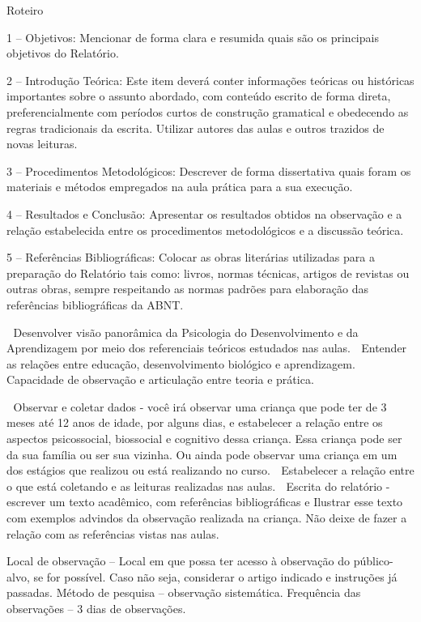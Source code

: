 \iffalse
Roteiro

1 – Objetivos: Mencionar de forma clara e resumida quais são os principais objetivos do Relatório.

2 – Introdução Teórica: Este item deverá conter informações teóricas ou históricas importantes sobre o assunto abordado, com conteúdo escrito de forma direta, preferencialmente com períodos curtos de construção gramatical e obedecendo as regras tradicionais da escrita. Utilizar autores das aulas e outros trazidos de novas leituras.

3 – Procedimentos Metodológicos: Descrever de forma dissertativa quais foram os materiais e métodos empregados na aula prática para a sua execução.

4 – Resultados e Conclusão: Apresentar os resultados obtidos na observação e a relação estabelecida entre os procedimentos metodológicos e a discussão teórica.

5 – Referências Bibliográficas: Colocar as obras literárias utilizadas para a preparação do Relatório tais como: livros, normas técnicas, artigos de revistas ou outras obras, sempre respeitando as normas padrões para elaboração das referências bibliográficas da ABNT.






	Desenvolver visão panorâmica da Psicologia do Desenvolvimento e da Aprendizagem por meio dos referenciais teóricos estudados nas aulas.
	Entender as relações entre educação, desenvolvimento biológico e aprendizagem.
	Capacidade de observação e articulação entre teoria e prática.

	Observar e coletar dados  - você irá observar uma criança que pode ter de 3 meses até 12 anos de idade, por alguns dias,  e estabelecer a relação entre os aspectos psicossocial, biossocial e cognitivo dessa criança. Essa criança pode ser da sua família ou ser sua vizinha. Ou ainda pode observar uma criança em um dos estágios que realizou ou está realizando no curso.
	Estabelecer a relação entre o que está coletando e as leituras realizadas nas aulas.
	Escrita do relatório -  escrever um texto acadêmico, com referências bibliográficas e Ilustrar esse texto com exemplos advindos da observação realizada na criança. Não deixe de fazer a relação com as referências vistas nas aulas.

Local de observação – Local em que possa ter acesso à observação do público-alvo, se for possível. Caso não seja, considerar o artigo indicado e instruções já passadas.
Método de pesquisa – observação sistemática.
Frequência das observações – 3 dias de observações.


